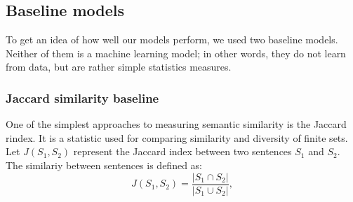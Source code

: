 \documentclass[10pt, a4paper]{article}
\begin{document}
\begin{table}[h!]
%
%
%
\subsection{Baseline models}

To get an idea of how well our models perform, we used two baseline models.
Neither of them is a machine learning model; in other words, they do not learn from data, but are rather simple statistics measures.

\subsubsection{Jaccard similarity baseline}

One of the simplest approaches to measuring semantic similarity is the Jaccard rindex.
It is a statistic used for comparing similarity and diversity of finite sets.
Let $J(S_1, S_2)$ represent the Jaccard index between two sentences $S_1$ and $S_2$.
The similariy between sentences is defined as:
\begin{equation}
	\label{eq:jaccard}
	J(S_1, S_2) = \frac{|S_1 \cap S_2|}{|S_1 \cup S_2|},
\end{equation}


\end{table}
\end{document}
